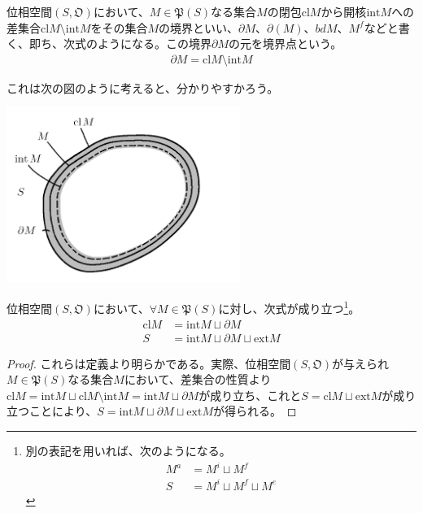 \documentclass[dvipdfmx]{jsarticle}
\begin{document}
\begin{dfn}
位相空間$\left( S,\mathfrak{O} \right)$において、$M \in \mathfrak{P}(S)$なる集合$M$の閉包${\mathrm{cl}}M$から開核${\mathrm{int}}M$への差集合${\mathrm{cl}}M \setminus {\mathrm{int}}M$をその集合$M$の境界といい、$\partial M$、$\partial(M)$、${bd}M$、$M^{f}$などと書く、即ち、次式のようになる。この境界$\partial M$の元を境界点という。
\begin{align*}
\partial M = {\mathrm{cl}}M \setminus {\mathrm{int}}M
\end{align*}
\end{dfn}\par
これは次の図のように考えると、分かりやすかろう。
\begin{center}
\includegraphics[width=76mm]{8.1.1.g.png}
\end{center}
\begin{thm}\label{8.1.1.16}
位相空間$\left( S,\mathfrak{O} \right)$において、$\forall M \in \mathfrak{P}(S)$に対し、次式が成り立つ\footnote{別の表記を用いれば、次のようになる。
\begin{align*}
  M^{a} &= M^{i} \sqcup M^{f}\\
  S &= M^{i} \sqcup M^{f} \sqcup M^{e}
\end{align*}}。
\begin{align*}
{\mathrm{cl}}M &= {\mathrm{int}}M \sqcup \partial M\\
S &= {\mathrm{int}}M \sqcup \partial M \sqcup {\mathrm{ext}}M
\end{align*}
\end{thm}
\begin{proof}
これらは定義より明らかである。実際、位相空間$\left( S,\mathfrak{O} \right)$が与えられ$M \in \mathfrak{P}(S)$なる集合$M$において、差集合の性質より${\mathrm{cl}}M = {\mathrm{int}}M \sqcup {\mathrm{cl}}M \setminus {\mathrm{int}}M = {\mathrm{int}}M \sqcup \partial M$が成り立ち、これと$S = {\mathrm{cl}}M \sqcup {\mathrm{ext}}M$が成り立つことにより、$S = {\mathrm{int}}M \sqcup \partial M \sqcup {\mathrm{ext}}M$が得られる。
\end{proof}
\end{document}
